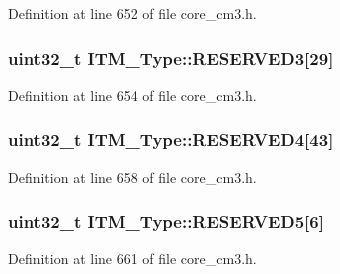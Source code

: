 Definition at line 652 of file core\+\_\+cm3.\+h.

\subsubsection[{\texorpdfstring{R\+E\+S\+E\+R\+V\+E\+D3}{RESERVED3}}]{\setlength{\rightskip}{0pt plus 5cm}uint32\+\_\+t I\+T\+M\+\_\+\+Type\+::\+R\+E\+S\+E\+R\+V\+E\+D3\mbox{[}29\mbox{]}}\hypertarget{structITM__Type_ab7708f0bcbbe9987cceadc4748c7e6b7}{}\label{structITM__Type_ab7708f0bcbbe9987cceadc4748c7e6b7}


Definition at line 654 of file core\+\_\+cm3.\+h.

\subsubsection[{\texorpdfstring{R\+E\+S\+E\+R\+V\+E\+D4}{RESERVED4}}]{\setlength{\rightskip}{0pt plus 5cm}uint32\+\_\+t I\+T\+M\+\_\+\+Type\+::\+R\+E\+S\+E\+R\+V\+E\+D4\mbox{[}43\mbox{]}}\hypertarget{structITM__Type_a45ad0b376a0a0f2ade55bbb7daf64ff2}{}\label{structITM__Type_a45ad0b376a0a0f2ade55bbb7daf64ff2}


Definition at line 658 of file core\+\_\+cm3.\+h.

\subsubsection[{\texorpdfstring{R\+E\+S\+E\+R\+V\+E\+D5}{RESERVED5}}]{\setlength{\rightskip}{0pt plus 5cm}uint32\+\_\+t I\+T\+M\+\_\+\+Type\+::\+R\+E\+S\+E\+R\+V\+E\+D5\mbox{[}6\mbox{]}}\hypertarget{structITM__Type_a7f70161bc2441d430b5c9d55aa7b7b5e}{}\label{structITM__Type_a7f70161bc2441d430b5c9d55aa7b7b5e}


Definition at line 661 of file core\+\_\+cm3.\+h.

